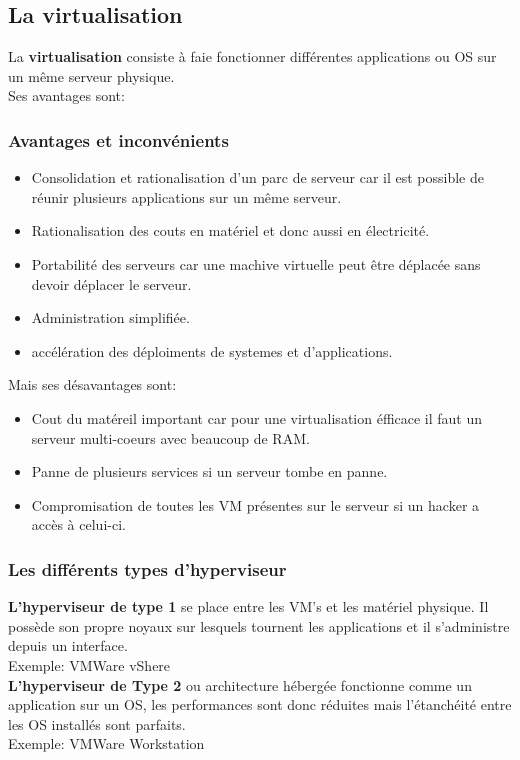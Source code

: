  \subsection{La virtualisation}
 La \textbf{virtualisation} consiste à faie fonctionner différentes applications ou OS sur un même serveur physique.\\
 Ses avantages sont:
 \subsubsection{Avantages et inconvénients}
 \begin{itemize}
	 \item Consolidation et rationalisation d'un parc de serveur car il est possible de réunir plusieurs applications sur un même serveur.
	 \item Rationalisation des couts en matériel et donc aussi en électricité.
	 \item Portabilité des serveurs car une machive virtuelle peut être déplacée sans devoir déplacer le serveur.
	 \item Administration simplifiée.
	 \item accélération des déploiments de systemes et d'applications.
 \end{itemize}
 Mais ses désavantages sont:
 \begin{itemize}
	 \item Cout du matéreil important car pour une virtualisation éfficace il faut un serveur multi-coeurs avec beaucoup de RAM\@.
	 \item Panne de plusieurs services si un serveur tombe en panne.
	 \item Compromisation de toutes les VM présentes sur le serveur si un hacker a accès à celui-ci.
 \end{itemize}
 \subsubsection{Les différents types d'hyperviseur}

 \textbf{L'hyperviseur de type 1} se place entre les VM's et les matériel physique. Il possède son propre noyaux sur lesquels tournent les applications et il s'administre depuis un interface.\\
 Exemple: VMWare vShere\\

 \indent
 \textbf{L'hyperviseur de Type 2} ou architecture hébergée fonctionne comme un application sur un OS, les performances sont donc réduites mais l'étanchéité entre les OS installés sont parfaits.\\
 Exemple: VMWare Workstation\\

